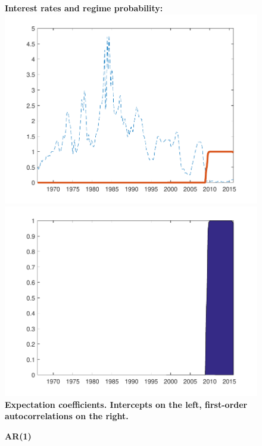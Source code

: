 \documentclass[12pt,reqno]{article}
\numberwithin{equation}{section}
\begin{document}
\newpage

\begin{figure}[H]
\caption{\large{\textbf{AR(1)}}}
\vspace{5 mm}

\textbf{Interest rates and regime probability:} \\

\includegraphics[scale=0.6]{NKPC_ree_init_AR1_regime.pdf}
\includegraphics[scale=0.6]{NKPC_ree_init_AR1_regimeProb.pdf}\\

\textbf{Expectation coefficients. Intercepts on the left, first-order autocorrelations on the right.}\\


\end{figure}
\end{document}
